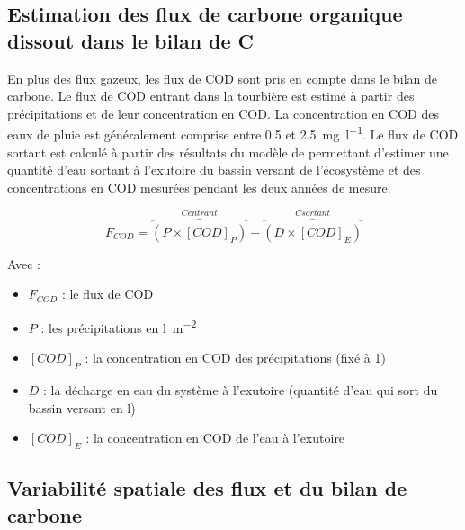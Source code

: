 \subsection{Estimation des flux de carbone organique dissout dans le bilan de C}

En plus des flux gazeux, les flux de COD sont pris en compte dans le bilan de carbone.
Le flux de COD entrant dans la tourbière est estimé à partir des précipitations et de leur concentration en COD.
La concentration en COD des eaux de pluie est généralement comprise entre \num{0.5} et \SI{2.5}{\milli\gram\per\litre}\citep{sigg2014}.
Le flux de COD sortant est calculé à partir des résultats  du modèle de \citet{binet2013} permettant d'estimer une quantité d'eau sortant à l'exutoire du bassin versant de l'écosystème et des concentrations en COD mesurées pendant les deux années de mesure.

\begin{equation}
\label{eq:COD}
F_{COD} = \overbrace{(P\times[COD]_{P})}^{C entrant}-\overbrace{(D\times[COD]_{E})}^{C sortant}
\end{equation}

Avec :
\begin{itemize}
\item $F_{COD}$ : le flux de COD
\item $P$ : les précipitations en \si{\litre\per\square\metre}
\item $[COD]_{P}$ : la concentration en COD des précipitations (fixé à \SI{1}{\mgl})
\item $D$ : la décharge en eau du système à l'exutoire (quantité d'eau qui sort du bassin versant en \si{\litre})
\item $[COD]_{E}$ : la concentration en COD de l'eau à l'exutoire 
\end{itemize}

\subsection{Variabilité spatiale des flux et du bilan de carbone}

